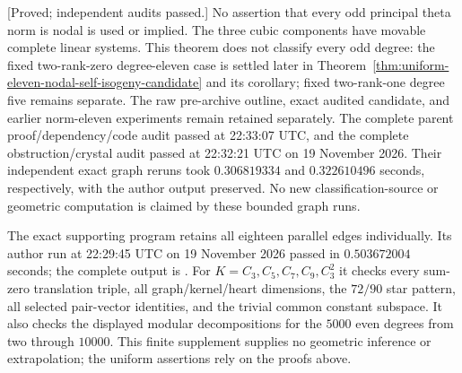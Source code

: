 \begin{remark}[Scope]
\label{rem:nine-theta-transfer-scope-candidate}
\textup{[Proved; independent audits passed.]}
No assertion that every odd principal theta norm is nodal is used
or implied. The three cubic components have movable complete
linear systems. This theorem does not classify every odd degree:
the fixed two-rank-zero degree-eleven case is settled later in
Theorem~\ref{thm:uniform-eleven-nodal-self-isogeny-candidate} and its
corollary; fixed two-rank-one degree five remains separate. The raw
pre-archive outline, exact audited candidate, and earlier norm-eleven
experiments remain retained separately.
The complete parent proof/dependency/code audit passed at
22:33:07 UTC, and the complete obstruction/crystal audit passed
at 22:32:21 UTC on 19 November 2026. Their independent exact
graph reruns took $0.306819334$ and $0.322610496$ seconds,
respectively, with the author output preserved. No new
classification-source or geometric computation is claimed by
these bounded graph runs.

The exact supporting program
retains all eighteen parallel edges individually. Its author run
at 22:29:45 UTC on 19 November 2026 passed in $0.503672004$ seconds;
the complete output is
.
For $K=C_3,C_5,C_7,C_9,C_3^2$ it checks every sum-zero translation
triple, all graph/kernel/heart dimensions, the $72/90$ star pattern,
all selected pair-vector identities, and the trivial common
constant subspace. It also checks the displayed modular
decompositions for the $5000$ even degrees from two through
$10000$. This finite supplement supplies no geometric inference
or extrapolation; the uniform assertions rely on the proofs above.
\end{remark}
